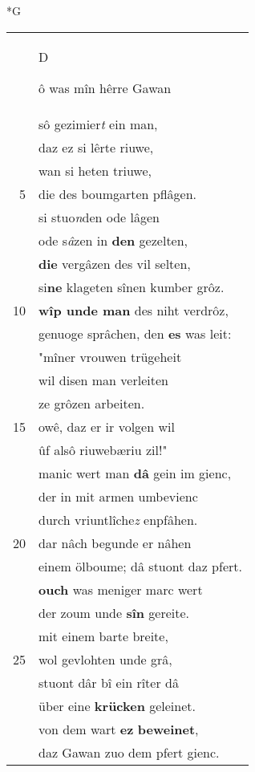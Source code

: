 \documentclass[8pt,a4paper,notitlepage]{article}
\begin{document}
\begin{table}[ht]
\begin{minipage}[t]{0.5\linewidth}
\small
\begin{center}*G
\end{center}
\begin{tabular}{rl}
 & \begin{large}D\end{large}ô was mîn hêrre Gawan\\ 
 & sô gezimier\textit{t} ein man,\\ 
 & daz ez si lêrte riuwe,\\ 
 & wan si heten triuwe,\\ 
5 & die des boumgarten pflâgen.\\ 
 & si stuo\textit{n}den ode lâgen\\ 
 & ode s\textit{â}zen in \textbf{den} gezelten,\\ 
 & \textbf{die} vergâzen des vil selten,\\ 
 & si\textbf{ne} klageten sînen kumber grôz.\\ 
10 & \textbf{wîp unde man} des niht verdrôz,\\ 
 & genuoge sprâchen, den \textbf{es} was leit:\\ 
 & "mîner vrouwen trügeheit\\ 
 & wil disen man verleiten\\ 
 & ze grôzen arbeiten.\\ 
15 & owê, daz er ir volgen wil\\ 
 & ûf alsô riuwebæriu zil!"\\ 
 & manic wert man \textbf{dâ} gein im gienc,\\ 
 & der in mit armen umbevienc\\ 
 & durch vriuntlîche\textit{z} enpfâhen.\\ 
20 & dar nâch begunde er nâhen\\ 
 & einem ölboume; dâ stuont daz pfert.\\ 
 & \textbf{ouch} was meniger marc wert\\ 
 & der zoum unde \textbf{sîn} gereite.\\ 
 & mit einem barte breite,\\ 
25 & wol gevlohten unde grâ,\\ 
 & stuont dâr bî ein rîter dâ\\ 
 & über eine \textbf{krücken} geleinet.\\ 
 & von dem wart \textbf{ez} \textbf{beweinet},\\ 
 & daz Gawan zuo dem pfert gienc.\\ 

\end{tabular}
\end{minipage}
\end{table}
\end{document}
